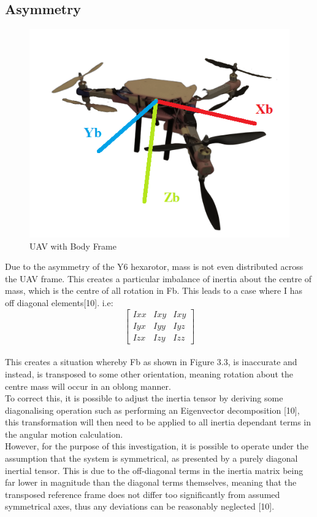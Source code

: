 \documentclass[12pt,a4paper,twoside]{report}
\begin{document}
				\subsection{Asymmetry}
					
					\begin{figure}[h!]
						\centering
						\includegraphics[width=0.6\linewidth]{UAVBodyFrame.png}
						\caption{UAV with Body Frame}
						\label{fig:uavbodyframe}
					\end{figure}
						
					Due to the asymmetry of the Y6 hexarotor, mass is not even distributed across the UAV frame. This creates a particular imbalance of inertia about the centre of mass, which is the centre of all rotation in Fb. This leads to a case where I has off diagonal elements[10]. i.e:
					\\
					$$ 
					\begin{bmatrix}
						Ixx & Ixy & Ixy \\
						Iyx & Iyy & Iyz \\
						Izx & Izy & Izz
					\end{bmatrix}
					$$
					\\
					This creates a situation whereby Fb as shown in Figure 3.3, is inaccurate and instead, is transposed to some other orientation, meaning rotation about the centre mass will occur in an oblong manner.
					\\
					To correct this, it is possible to adjust the inertia tensor by deriving some diagonalising operation such as performing an Eigenvector decomposition [10], this transformation will then need to be applied to all inertia dependant terms in the angular motion calculation.
					\\  
					However, for the purpose of this investigation, it is possible to operate under the assumption that the system is symmetrical, as presented by a purely diagonal inertial tensor. This is due to the off-diagonal terms in the inertia matrix being far lower in magnitude than the diagonal terms themselves, meaning that the transposed reference frame does not differ too significantly from assumed symmetrical axes, thus any deviations can be reasonably neglected [10].
			
\end{document}
